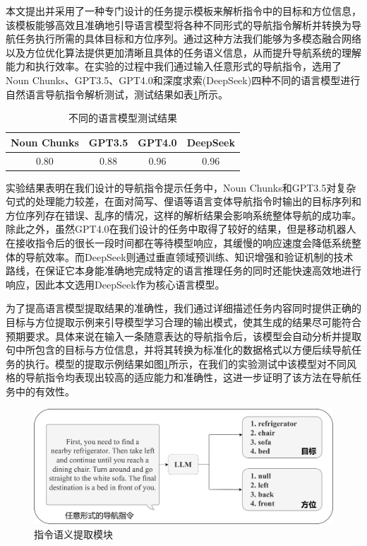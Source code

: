 本文提出并采用了一种专门设计的任务提示模板来解析指令中的目标和方位信息，该模板能够高效且准确地引导语言模型将各种不同形式的导航指令解析并转换为导航任务执行所需的具体目标和方位序列。通过这种方法我们能够为多模态融合网络以及方位优化算法提供更加清晰且具体的任务语义信息，从而提升导航系统的理解能力和执行效率。在实验的过程中我们通过输入任意形式的导航指令，选用了Noun Chunks、GPT3.5、GPT4.0和深度求索(DeepSeek)四种不同的语言模型进行自然语言导航指令解析测试，测试结果如表\ref{deepseekcmp}所示。
\begin{table}
\caption{\label{deepseekcmp}不同的语言模型测试结果}
\centering
\small
\begin{tabular}{cccc}
    \hline
    Noun Chunks & GPT3.5 & GPT4.0 & DeepSeek \tabularnewline 
    \hline 
    0.80 & 0.88 & 0.96 & 0.96 \tabularnewline
    \hline 
\end{tabular}
\end{table}
实验结果表明在我们设计的导航指令提示任务中，Noun Chunks和GPT3.5对复杂句式的处理能力较差，在面对简写、俚语等语言变体导航指令时输出的目标序列和方位序列存在错误、乱序的情况，这样的解析结果会影响系统整体导航的成功率。除此之外，虽然GPT4.0在我们设计的任务中取得了较好的结果，但是移动机器人在接收指令后的很长一段时间都在等待模型响应，其缓慢的响应速度会降低系统整体的导航效率。而DeepSeek则通过垂直领域预训练、知识增强和验证机制的技术路线，在保证它本身能准确地完成特定的语言推理任务的同时还能快速高效地进行响应，因此本文选用DeepSeek\cite{guo2025deepseek}作为核心语言模型。

为了提高语言模型提取结果的准确性，我们通过详细描述任务内容同时提供正确的目标与方位提取示例来引导模型学习合理的输出模式，使其生成的结果尽可能符合预期要求。具体来说在输入一条随意表达的导航指令后，该模型会自动分析并提取句中所包含的目标与方位信息，并将其转换为标准化的数据格式以方便后续导航任务的执行。模型的提取示例结果如图\ref{Extract_orien}所示，在我们的实验测试中该模型对不同风格的导航指令均表现出较高的适应能力和准确性，这进一步证明了该方法在导航任务中的有效性。


\begin{figure}[htbp]
    \centering
    \includegraphics[scale=0.05]{Fig/Extract_orien.png}
    \caption{\label{Extract_orien}指令语义提取模块}
\end{figure}




